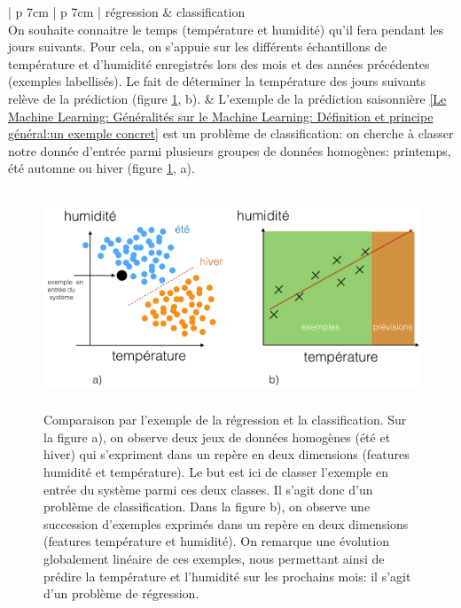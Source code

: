 \begin{table}[H]
	\centering
	\begin{tabular}{ | p {7cm} | p {7cm} |}
		\hline
		régression & classification \\
		\hline
		On souhaite connaitre le temps (température et humidité) qu'il fera pendant les jours suivants. Pour cela, on s'appuie sur les différents échantillons de température et d'humidité enregistrés lors des mois et des années précédentes (exemples labellisés). Le fait de déterminer la température des jours suivants relève de la prédiction (figure \ref{fig:Comparaison par l'exemple de la régression et la classification}, b).  
		 &  L'exemple de la prédiction saisonnière \ref{Le Machine Learning: Généralités sur le Machine Learning: Définition et principe général:un exemple concret} est un problème de classification: on cherche à classer notre donnée d'entrée parmi plusieurs groupes de données homogènes: printemps, été automne ou hiver (figure \ref{fig:Comparaison par l'exemple de la régression et la classification}, a). \\
		\hline 
	\end{tabular}
	\caption[Comparaison des différentes catégories d'apprentissage supervisé]{Comparaison entre l'apprentissage supervisé de type régression et supervisé de type classification}
	\label {tab: Comparaison des différentes catégories d'apprentissage supervisé}
\end{table}

\begin{figure}[h]
	\centering\includegraphics[height=6.5cm]{images/regression_class.jpeg}
	\caption[Comparaison par l'exemple de la régression et de la classification]{Comparaison par l'exemple de la régression et la classification. Sur la figure a), on observe deux jeux de données homogènes (été et hiver) qui s'expriment dans un repère en deux dimensions (features humidité et température). Le but est ici de classer l'exemple en entrée du système parmi ces deux classes. Il s'agit donc d'un problème de classification. Dans la figure b), on observe une succession d'exemples exprimés dans un repère en deux dimensions (features température et humidité). On remarque une évolution globalement linéaire de ces exemples, nous permettant ainsi de prédire la température et l'humidité sur les prochains mois: il s'agit d'un problème de régression.}
	\label{fig:Comparaison par l'exemple de la régression et la classification}
\end{figure}





